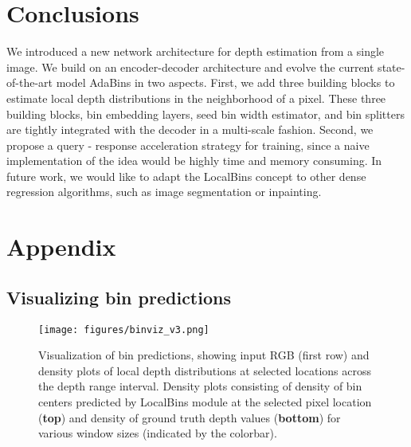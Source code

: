 \documentclass[runningheads]{llncs}
\begin{document}
\section{Conclusions}
We introduced a new network architecture for depth estimation from a single image. We build on an encoder-decoder architecture and evolve the current state-of-the-art model AdaBins in two aspects. First, we add three building blocks to estimate local depth distributions in the neighborhood of a pixel. These three building blocks, bin embedding layers, seed bin width estimator, and bin splitters are tightly integrated with the decoder in a multi-scale fashion. Second, we propose a query - response acceleration strategy for training, since a naive implementation of the idea would be highly time and memory consuming.
In future work, we would like to adapt the LocalBins concept to other dense regression algorithms, such as image segmentation or inpainting.





\clearpage





















\clearpage
\appendix
\section{Appendix}
\subsection{Visualizing bin predictions}
\begin{figure}
    \centering
    \texttt{[image: figures/binviz\_v3.png]}
    \caption{Visualization of bin predictions, showing input RGB (first row) and density plots of local depth distributions at selected locations across the depth range interval. Density plots consisting of density of bin centers predicted by LocalBins module at the selected pixel location (\textbf{top}) and density of ground truth depth values (\textbf{bottom}) for various window sizes (indicated by the colorbar).}
    \label{fig:qualt_bins}
\end{figure}
\end{document}
